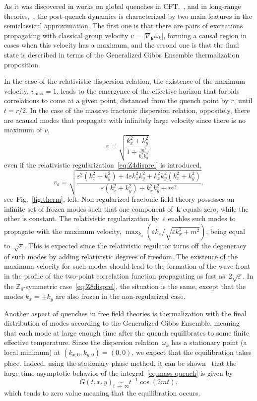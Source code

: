 \documentclass[a4paper,12pt]{article}
\newcommand{\be}{\begin{equation}}
\newcommand{\ee}{\end{equation}}
\newcommand{\skipline}{\vspace{\baselineskip}}
\newcommand{\eps}{\varepsilon}
\newcommand{\om}{\omega}
\newcommand{\largetimesim}{\underset{t\,\to\,\infty}{\sim}}
\newcommand{\Z}[1]{\mathbb{Z}_{#1}}
\newcommand{\figref}[1]{Fig.~\ref{#1}}
\begin{document}
As it was discovered in works on global quenches in CFT,~\cite{Calabrese:2007rg}, and in long-range theories,~\cite{Rajabpour:2014osa}, the post-quench dynamics is characterized by two main features in the semiclassical approximation. The first one is that there are pairs of excitations propagating with classical group velocity $v = |\nabla_\mathbf{k}\om_k|$, forming a causal region in cases when this velocity has a maximum, and the second one is that the final state is described in terms of the Generalized Gibbs Ensemble thermalization proposition.

\skipline

In the case of the relativistic dispersion relation, the existence of the maximum velocity, $v_\text{max} = 1$, leads to the emergence of the effective horizon that forbids correlations to come at a given point, distanced from the quench point by $r$, until $t = r/2$. In the case of the massive fractonic dispersion relation, oppositely, there are acausal modes that propagate with infinitely large velocity since there is no maximum of $v$,
\be
    v = \sqrt{\frac{k_x^2 + k_y^2}{1 + \displaystyle\frac{m^2}{k_x^2 k_y^2}}},
\ee
even if the relativistic regularization~\eqref{eq:Z4disprel} is introduced,
\be
    v_{\eps} = \sqrt{\frac{\eps^2\left(k_x^2 + k_y^2\right) + 4\eps k_x^2k_y^2 + k_x^2k_y^2\left(k_x^2 + k_y^2\right)}{\eps\left(k_x^2 + k_y^2\right) + k_x^2k_y^2 + m^2}},
    \label{eq:vel}
\ee
see~\figref{fig:therm}, left. Non-regularized fractonic field theory possesses an infinite set of frozen modes such that one component of~$\mathbf{k}$ equals zero, while the other is constant. The relativistic regularization by~$\eps$ enables such modes to propagate with the maximum velocity, $\max_{k_x}(\eps k_x/\sqrt{\eps k_x^2 + m^2})$, being equal to~$\sqrt{\eps}$. This is expected since the relativistic regulator turns off the degeneracy of such modes by adding relativistic degrees of freedom. The existence of the maximum velocity for such modes should lead to the formation of the wave front in the profile of the two-point correlation function propagating as fast as~$2\sqrt{\eps}$. In the $\Z8$-symmetric case~\eqref{eq:Z8disprel}, the situation is the same, except that the modes $k_x = \pm k_y$ are also frozen in the non-regularized case.

\skipline

Another aspect of quenches in free field theories is thermalization with the final distribution of modes according to the Generalized Gibbs Ensemble, meaning that each mode at large enough time after the quench equilibrates to some finite effective temperature. Since the dispersion relation~$\om_k$ has a stationary point (a local minimum) at $(k_{x,0}, k_{y,0}) = (0, 0)$, we expect that the equilibration takes place. Indeed, using the stationary phase method, it can be shown~\cite{Calabrese:2007rg} that the large-time asymptotic behavior of the integral~\eqref{eq:mass-quench} is given by
\be
    G(t, x, y) \largetimesim t^{-1}\cos\left(2mt\right),
\ee
which tends to zero value meaning that the equilibration occurs.
\end{document}
